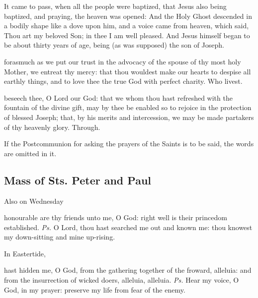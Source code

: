  It came to pass, when all the people were baptized, that Jesus also being baptized, and praying, the heaven was opened:  And the Holy Ghost descended in a bodily shape like a dove upon him, and a voice came from heaven, which said, Thou art my beloved Son; in thee I am well pleased. And Jesus himself began to be about thirty years of age, being (as was supposed) the son of Joseph.


\secret
{} forasmuch as we put our trust in the advocacy of the spouse of thy most holy Mother, we entreat thy mercy: that thou wouldest make our hearts to despise all earthly things, and to love thee the true God with perfect charity. Who livest.


\postcommunion
{} beseech thee, O Lord our God: that we whom thou hast refreshed with the fountain of the divine gift, may by thee be enabled so to rejoice in the protection of blessed Joseph; that, by his merits and intercession, we may be made partakers of thy heavenly glory. Through.

\begin{rubric}
If the Postcommunion for asking the prayers of the Saints is to be said, the words  are omitted in it.
\end{rubric}


\subsection{Mass of Sts. Peter and Paul}
\begin{inhead}
	Also on Wednesday
\end{inhead}

\introit
{} honourable are thy friends unto me, O God: right well is their princedom established. \textit{Ps.} O Lord, thou hast searched me out and known me: thou knowest my down-sitting and mine up-rising.

\begin{rubric}
	In Eastertide,
\end{rubric}
 hast hidden me, O God, from the gathering together of the froward, alleluia: and from the insurrection of wicked doers, alleluia, alleluia. \textit{Ps.} Hear my voice, O God, in my prayer: preserve my life from fear of the enemy.

